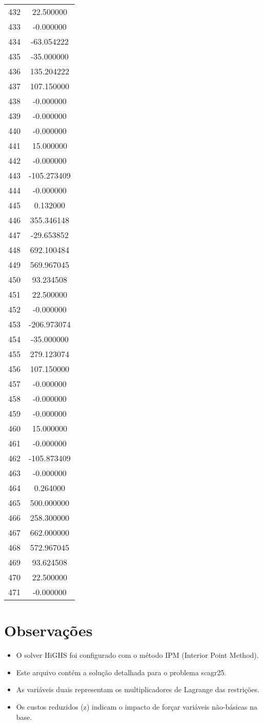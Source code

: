 \documentclass[12pt]{article}
\begin{document}
\begin{longtable}{@{}cc@{}}
432 & 22.500000 \\
433 & -0.000000 \\
434 & -63.054222 \\
435 & -35.000000 \\
436 & 135.204222 \\
437 & 107.150000 \\
438 & -0.000000 \\
439 & -0.000000 \\
440 & -0.000000 \\
441 & 15.000000 \\
442 & -0.000000 \\
443 & -105.273409 \\
444 & -0.000000 \\
445 & 0.132000 \\
446 & 355.346148 \\
447 & -29.653852 \\
448 & 692.100484 \\
449 & 569.967045 \\
450 & 93.234508 \\
451 & 22.500000 \\
452 & -0.000000 \\
453 & -206.973074 \\
454 & -35.000000 \\
455 & 279.123074 \\
456 & 107.150000 \\
457 & -0.000000 \\
458 & -0.000000 \\
459 & -0.000000 \\
460 & 15.000000 \\
461 & -0.000000 \\
462 & -105.873409 \\
463 & -0.000000 \\
464 & 0.264000 \\
465 & 500.000000 \\
466 & 258.300000 \\
467 & 662.000000 \\
468 & 572.967045 \\
469 & 93.624508 \\
470 & 22.500000 \\
471 & -0.000000 \\

\end{longtable}


\section{Observações}

\begin{itemize}
\item O solver HiGHS foi configurado com o método IPM (Interior Point Method).
\item Este arquivo contém a solução detalhada para o problema scagr25.
\item As variáveis duais representam os multiplicadores de Lagrange das restrições.
\item Os custos reduzidos (z) indicam o impacto de forçar variáveis não-básicas na base.
\end{itemize}
\end{document}
